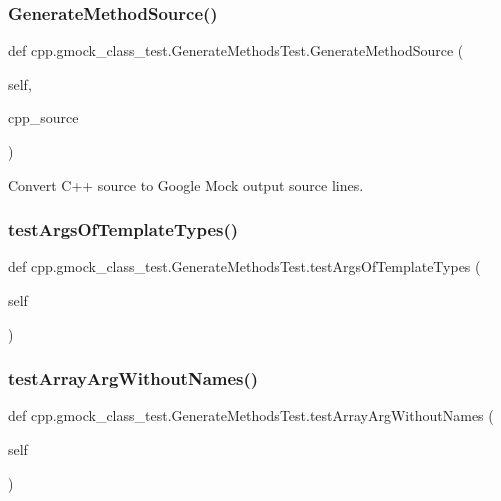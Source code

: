 \subsubsection{\texorpdfstring{GenerateMethodSource()}{GenerateMethodSource()}}
{\footnotesize\ttfamily def cpp.\+gmock\+\_\+class\+\_\+test.\+Generate\+Methods\+Test.\+Generate\+Method\+Source (\begin{DoxyParamCaption}\item[{}]{self,  }\item[{}]{cpp\+\_\+source }\end{DoxyParamCaption})}

\begin{DoxyVerb}Convert C++ source to Google Mock output source lines.\end{DoxyVerb}
 \mbox{\label{classcpp_1_1gmock__class__test_1_1GenerateMethodsTest_ade05313ccffe74f9eaa42fb66c14f702}} 
\subsubsection{\texorpdfstring{testArgsOfTemplateTypes()}{testArgsOfTemplateTypes()}}
{\footnotesize\ttfamily def cpp.\+gmock\+\_\+class\+\_\+test.\+Generate\+Methods\+Test.\+test\+Args\+Of\+Template\+Types (\begin{DoxyParamCaption}\item[{}]{self }\end{DoxyParamCaption})}

\mbox{\label{classcpp_1_1gmock__class__test_1_1GenerateMethodsTest_a544cd40e30b5dc3fbcf42385f0a54ad1}} 
\subsubsection{\texorpdfstring{testArrayArgWithoutNames()}{testArrayArgWithoutNames()}}
{\footnotesize\ttfamily def cpp.\+gmock\+\_\+class\+\_\+test.\+Generate\+Methods\+Test.\+test\+Array\+Arg\+Without\+Names (\begin{DoxyParamCaption}\item[{}]{self }\end{DoxyParamCaption})}

